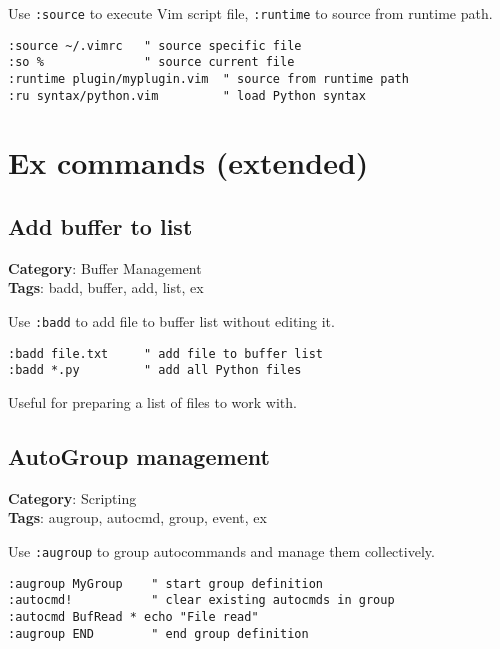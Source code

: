 {{{{{Use {\footnotesize \Verb§:source§} to execute Vim script file, {\footnotesize \Verb§:runtime§} to source from runtime path.

\begin{Exa*}{}
\begin{Verbatim}[fontsize=\footnotesize, breaklines, breakanywhere]
:source ~/.vimrc   " source specific file
:so %              " source current file
:runtime plugin/myplugin.vim  " source from runtime path
:ru syntax/python.vim         " load Python syntax
\end{Verbatim}
\end{Exa*}

\chapter{Ex commands (extended)}
\section{Add buffer to list}

\textbf{Category}: Buffer Management\\ \textbf{Tags}: badd, buffer, add, list, ex
\vspace{0.5cm}

Use {\footnotesize \Verb§:badd§} to add file to buffer list without editing it.

\begin{Exa*}{}
\begin{Verbatim}[fontsize=\footnotesize, breaklines, breakanywhere]
:badd file.txt     " add file to buffer list
:badd *.py         " add all Python files
\end{Verbatim}
\end{Exa*}

Useful for preparing a list of files to work with.

\section{AutoGroup management}

\textbf{Category}: Scripting\\ \textbf{Tags}: augroup, autocmd, group, event, ex
\vspace{0.5cm}

Use {\footnotesize \Verb§:augroup§} to group autocommands and manage them collectively.

\begin{Exa*}{}
\begin{Verbatim}[fontsize=\footnotesize, breaklines, breakanywhere]
:augroup MyGroup    " start group definition
:autocmd!           " clear existing autocmds in group
:autocmd BufRead * echo "File read"
:augroup END        " end group definition
\end{Verbatim}
\end{Exa*}

}}}}}
